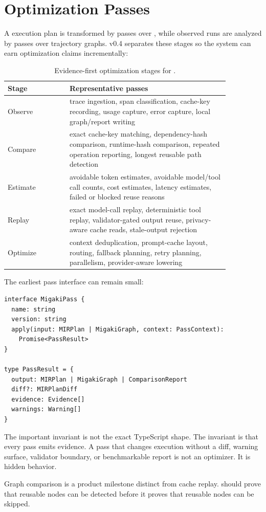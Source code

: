 \section{Optimization Passes}

A \migaki{} execution plan is transformed by passes over \mir, while observed runs are analyzed by passes over trajectory graphs. v0.4 separates these stages so the system can earn optimization claims incrementally:

\begin{table}[t]
\centering
\small
\begin{tabular}{p{0.24\linewidth}p{0.62\linewidth}}
\toprule
\textbf{Stage} & \textbf{Representative passes} \\
\midrule
Observe & trace ingestion, span classification, cache-key recording, usage capture, error capture, local graph/report writing \\
Compare & exact cache-key matching, dependency-hash comparison, runtime-hash comparison, repeated operation reporting, longest reusable path detection \\
Estimate & avoidable token estimates, avoidable model/tool call counts, cost estimates, latency estimates, failed or blocked reuse reasons \\
Replay & exact model-call replay, deterministic tool replay, validator-gated output reuse, privacy-aware cache reads, stale-output rejection \\
Optimize & context deduplication, prompt-cache layout, routing, fallback planning, retry planning, parallelism, provider-aware lowering \\
\bottomrule
\end{tabular}
\caption{Evidence-first optimization stages for \migaki{}.}
\end{table}

The earliest pass interface can remain small:

\begin{lstlisting}[language={}]
interface MigakiPass {
  name: string
  version: string
  apply(input: MIRPlan | MigakiGraph, context: PassContext):
    Promise<PassResult>
}

type PassResult = {
  output: MIRPlan | MigakiGraph | ComparisonReport
  diff?: MIRPlanDiff
  evidence: Evidence[]
  warnings: Warning[]
}
\end{lstlisting}

The important invariant is not the exact TypeScript shape. The invariant is that every pass emits evidence. A pass that changes execution without a diff, warning surface, validator boundary, or benchmarkable report is not an optimizer. It is hidden behavior.

\begin{principle}
Graph comparison is a product milestone distinct from cache replay. \migaki{} should prove that reusable nodes can be detected before it proves that reusable nodes can be skipped.
\end{principle}
